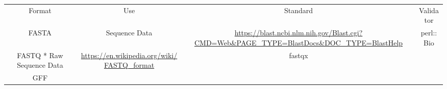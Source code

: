 \begin{tabular}{cccc}
{Format} & {Use} & {Standard} & {Validator} \\
FASTA & Sequence Data & \url{https://blast.ncbi.nlm.nih.gov/Blast.cgi?CMD=Web&PAGE_TYPE=BlastDocs&DOC_TYPE=BlastHelp} & perl::Bio \\
FASTQ * Raw Sequence Data & \url{https://en.wikipedia.org/wiki/FASTQ_format} & fastqx \\
GFF
\end{tabular}